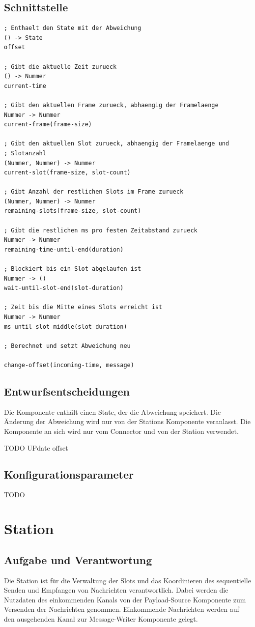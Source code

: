 \documentclass[draft=false
              ,paper=a4
              ,twoside=false
              ,fontsize=11pt
              ,headsepline
              ,BCOR10mm
              ,DIV11
              ]{scrbook}
\begin{document}
\subsection{Schnittstelle}
\begin{lstlisting}
; Enthaelt den State mit der Abweichung
() -> State
offset

; Gibt die aktuelle Zeit zurueck
() -> Nummer
current-time

; Gibt den aktuellen Frame zurueck, abhaengig der Framelaenge
Nummer -> Nummer
current-frame(frame-size)

; Gibt den aktuellen Slot zurueck, abhaengig der Framelaenge und
; Slotanzahl
(Nummer, Nummer) -> Nummer
current-slot(frame-size, slot-count)

; Gibt Anzahl der restlichen Slots im Frame zurueck
(Nummer, Nummer) -> Nummer
remaining-slots(frame-size, slot-count)

; Gibt die restlichen ms pro festen Zeitabstand zurueck
Nummer -> Nummer
remaining-time-until-end(duration)

; Blockiert bis ein Slot abgelaufen ist
Nummer -> ()
wait-until-slot-end(slot-duration)

; Zeit bis die Mitte eines Slots erreicht ist
Nummer -> Nummer
ms-until-slot-middle(slot-duration)

; Berechnet und setzt Abweichung neu

change-offset(incoming-time, message)
\end{lstlisting}

\subsection{Entwurfsentscheidungen}
Die Komponente enthält einen State, der die Abweichung speichert. Die Änderung der Abweichung wird nur von der Stations Komponente veranlasst. Die Komponente an sich wird nur vom Connector und von der Station verwendet.

TODO UPdate offset

\subsection{Konfigurationsparameter}
TODO

\section{Station}
\subsection{Aufgabe und Verantwortung}
Die Station ist für die Verwaltung der Slots und das Koordinieren des sequentielle Senden und Empfangen von Nachrichten verantwortlich. Dabei werden die Nutzdaten des einkommenden Kanals von der Payload-Source Komponente zum Versenden der Nachrichten genommen.
Einkommende Nachrichten werden auf den ausgehenden Kanal zur Message-Writer Komponente gelegt.
\end{document}
